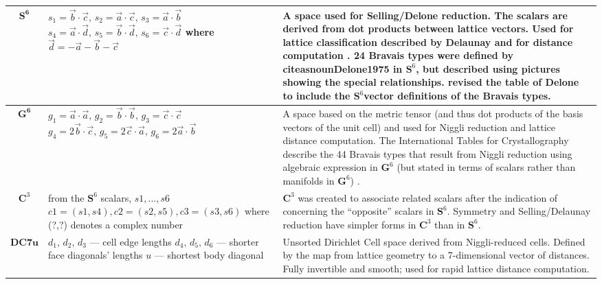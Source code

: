 \documentclass[preprint]{iucr}              %
\numberwithin{equation}{section}
\newcommand{\GVI}{\ensuremath{\mathbf{G}^{6}}}
\newcommand{\SVI}{\ensuremath{\mathbf{S}^{6}}}
\newcommand{\CIII}{\ensuremath{\mathbf{C}^{3}}}
\begin{document}
\begin{table}
\begin{tabular}{|c|l|p{7cm}|}
$\mathbf{S^6}$ &
\parbox[t]{5.5cm}{
	$s_1 = \vec{b} \cdot \vec{c},\, s_2 = \vec{a} \cdot \vec{c},\, s_3 = \vec{a} \cdot \vec{b}$\\
	$s_4 = \vec{a} \cdot \vec{d},\, s_5 = \vec{b} \cdot \vec{d},\, s_6 = \vec{c} \cdot \vec{d}$\\ \\
	\quad where $\vec{d} = -\vec{a} - \vec{b} - \vec{c}$
} &
A space used for Selling/Delone reduction. The scalars are derived from dot products between lattice vectors. Used for lattice classification described by Delaunay and for distance computation \cite{Andrews2019b}. 24 Bravais types were defined by citeasnoun{Delone1975} in \SVI{}, but 
described using pictures showing the special relationships.  revised the table of Delone to
include the \SVI vector definitions of the Bravais types.\\

		\hline
		$\mathbf{G^6}$ &
		\parbox[t]{5.5cm}{
			$g_1 = \vec{a} \cdot \vec{a},\, g_2 = \vec{b} \cdot \vec{b},\, g_3 = \vec{c} \cdot \vec{c}$\\
			$g_4 = 2\vec{b} \cdot \vec{c},\, g_5 =2 \vec{c} \cdot \vec{a},\, g_6 = 2\vec{a} \cdot \vec{b}$
		} &
		A space based on the metric tensor (and thus dot products 
		of the basis vectors of the unit cell) and used for Niggli reduction and lattice distance computation. \cite{Andrews2014}
		The International Tables for Crystallography describe the 44
		Bravais types that result from Niggli reduction using
		algebraic expression in \GVI{} (but stated in terms of scalars
		rather than manifolds in \GVI{}) \cite{ITC_VolumeA_2016}. \\
		\hline
		
\CIII &
\parbox[t]{5.5cm}{
	from the \SVI{} scalars, $s1,...,s6$\\
	$c1=(s1,s4), c2=(s2,s5), c3=(s3,s6)$\\
	where (?,?) denotes a complex number
} &
\CIII{} was created to associate related scalars after the
indication of  concerning the ``opposite''
scalars in \SVI{}. Symmetry and Selling/Delaunay reduction have
simpler forms in \CIII{} than in \SVI{}. \cite{andrews2023complex}\\
\hline
		
		$\mathbf{DC7u}$ &
		\parbox[t]{5.5cm}{
			$d_1,\, d_2,\, d_3$ — cell edge lengths\\
			$d_4,\, d_5,\, d_6$ — shorter face diagonals' lengths\\
			$u$ — shortest body diagonal
		} &
		Unsorted Dirichlet Cell space derived from Niggli-reduced cells. Defined by the map from lattice geometry to a 7-dimensional vector of distances. Fully invertible and smooth; used for rapid lattice distance computation. \cite{bernstein2023invertible}\\
		\hline

	\end{tabular}
\end{table}
\end{document}
